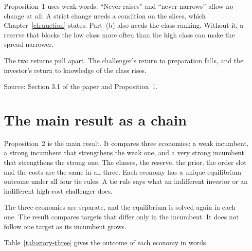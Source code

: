 \begin{watchout}
Proposition~1 uses weak words. ``Never raises'' and ``never narrows'' allow no change at all. A strict change needs a condition on the slices, which Chapter~\ref{ch:auction} states. Part~(b) also needs the class ranking. Without it, a reserve that blocks the low class more often than the high class can make the spread narrower.
\end{watchout}

The two returns pull apart. The challenger's return to preparation falls, and the investor's return to knowledge of the class rises.

{\small\color{notegrey}Source: Section 3.1 of the paper and Proposition~1.}

\section{The main result as a chain}\label{sec:story-chain}

Proposition~2 is the main result. It compares three economies: a weak incumbent, a strong incumbent that strengthens the weak one, and a very strong incumbent that strengthens the strong one. The classes, the reserve, the prior, the order slot and the costs are the same in all three. Each economy has a unique equilibrium outcome under all four tie rules. A tie rule says what an indifferent investor or an indifferent high-cost challenger does.

\begin{watchout}
The three economies are separate, and the equilibrium is solved again in each one. The result compares targets that differ only in the incumbent. It does not follow one target as its incumbent grows.
\end{watchout}

Table~\ref{tab:story-three} gives the outcome of each economy in words.


